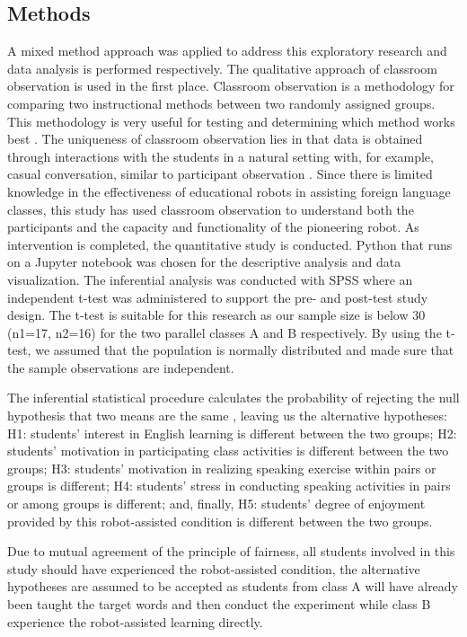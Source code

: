 \documentclass[english]{textolivre}
\begin{document}
\subsection{Methods}\label{sec-secoes}
A mixed method approach was applied to address this exploratory research and data analysis is performed respectively. The qualitative approach of classroom observation is used in the first place. Classroom observation is a methodology for comparing two instructional methods between two randomly assigned groups. This methodology is very useful for testing and determining which method works best \cite{vidhiasi_dhion_classroom_2018}. The uniqueness of classroom observation lies in that data is obtained through interactions with the students in a natural setting with, for example, casual conversation, similar to participant observation \cite{shin_review_2022}. Since there is limited knowledge in the effectiveness of educational robots in assisting foreign language classes, this study has used classroom observation to understand both the participants and the capacity and functionality of the pioneering robot. As intervention is completed, the quantitative study is conducted. Python that runs on a Jupyter notebook was chosen for the descriptive analysis and data visualization. The inferential analysis was conducted with SPSS where an independent t-test was administered to support the pre- and post-test study design. The t-test is suitable for this research as our sample size is below 30 (n1=17, n2=16) for the two parallel classes A and B respectively. By using the t-test, we assumed that the population is normally distributed and made sure that the sample observations are independent.

The inferential statistical procedure calculates the probability of rejecting the null hypothesis that two means are the same \cite{gerald_brief_2018}, leaving us the alternative hypotheses: H1: students’ interest in English learning is different between the two groups; H2: students’ motivation in participating class activities is different between the two groups; H3: students’ motivation in realizing speaking exercise within pairs or groups is different; H4: students’ stress in conducting speaking activities in pairs or among groups is different; and, finally, H5: students’ degree of enjoyment provided by this robot-assisted condition is different between the two groups.

Due to mutual agreement of the principle of fairness, all students involved in this study should have experienced the robot-assisted condition, the alternative hypotheses are assumed to be accepted as students from class A will have already been taught the target words and then conduct the experiment while class B experience the robot-assisted learning directly. 
\end{document}
